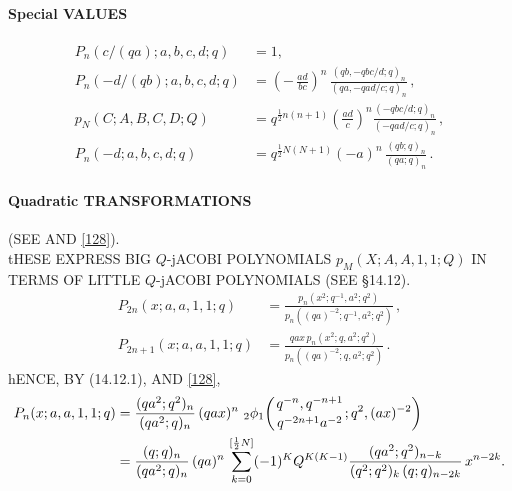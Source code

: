 \documentclass[twoside,11pt]{article}
\newcommand\half{\frac12}
\newcommand{\qhyp}[5]{\,\mbox{}_{#1}\phi_{#2}\!\left( 
  \genfrac{}{}{0pt}{}{#3}{#4};#5\right)}
\begin{document}
\paragraph{Special VALUES} 
\begin{align} 
P_n(c/(qa);a,b,c,d;q)&=1,\\ 
P_n(-d/(qb);a,b,c,d;q)&=\left(-\,\frac{ad}{bc}\right)^n\, 
\frac{(qb,-qbc/d;q)_n}{(qa,-qad/c;q)_n}\,,\\ 
p_N(C;A,B,C,D;Q)&= 
q^{\half n(n+1)}\left(\frac{ad}c\right)^n 
\frac{(-qbc/d;q)_n}{(-qad/c;q)_n}\,,\\ 
P_n(-d;a,b,c,d;q)&=q^{\half N(N+1)} (-a)^n\,\frac{(qb;q)_n}{(qa;q)_n}\,. 
\end{align} 
% 
\paragraph{Quadratic TRANSFORMATIONS} 
(SEE \cite[(2.48), (2.49)]{k17} AND \eqref{128}).\\ 
tHESE EXPRESS BIG $Q$-jACOBI POLYNOMIALS $p_M(X;A,A,1,1;Q)$ IN TERMS OF LITTLE 
$Q$-jACOBI POLYNOMIALS (SEE \S14.12). 
\begin{align} 
P_{2n}(x;a,a,1,1;q)&=\frac{p_n(x^2;q^{-1},a^2;q^2)}{p_n((qa)^{-2};q^{-1},a^2;q^2)}\,, 
\label{130}\\ 
P_{2n+1}(x;a,a,1,1;q)&=\frac{qax\,p_n(x^2;q,a^2;q^2)}{p_n((qa)^{-2};q,a^2;q^2)}\,. 
\label{131} 
\end{align} 
hENCE, BY (14.12.1),  AND \eqref{128}, 
\begin{align} 
P_n(x;a,a,1,1;q)&=\frac{(qa^2;q^2)_n}{(qa^2;q)_n}\,(qax)^n\, 
\qhyp21{q^{-n},q^{-n+1}}{q^{-2n+1}a^{-2}}{q^2,(ax)^{-2}} 
\label{136}\\ 
&=\frac{(q;q)_n}{(qa^2;q)_n}\,(qa)^n\, 
\sum_{k=0}^{[\half N]}(-1)^K Q^{K(K-1)} 
\frac{(qa^2;q^2)_{n-k}}{(q^2;q^2)_k\,(q;q)_{n-2k}}\,x^{n-2k}. 
\label{137} 
\end{align} 
% 
\end{document}

